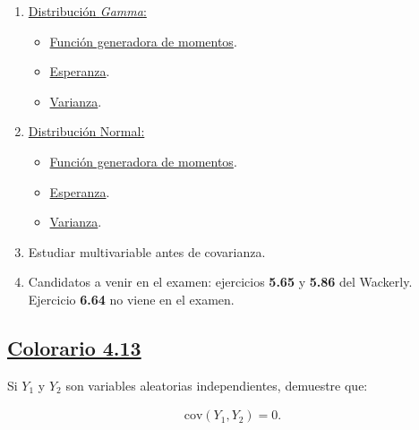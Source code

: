 \documentclass[8pt]{article}
\begin{document}
\begin{enumerate}
    \item \hyperref[subsec:distribucion_gamma]{Distribución \textit{Gamma}:}
        \label{subsec:distribucion_gamma_tag}
    \begin{itemize}
        \item \hyperref[subsec:funciongeneradora_gamma]{Función generadora de momentos}.
            \label{subsec:funciongeneradora_gamma_tag}
        \item \hyperref[subsec:esperanza_gamma]{Esperanza}.
            \label{subsec:esperanza_gamma_tag}
        \item \hyperref[subsec:varianza_gamma]{Varianza}.
            \label{subsec:varianza_gamma_tag}
    \end{itemize}

    \item \hyperref[subsec:distribucion_normal]{Distribución Normal:}
        \label{subsec:distribucion_normal_tag}
    \begin{itemize}
        \item \hyperref[subsec:funciongeneradora_normal]{Función generadora de momentos}.
            \label{subsec:funciongeneradora_normal_tag}
        \item \hyperref[subsec:esperanza_normal]{Esperanza}.
            \label{subsec:esperanza_normal_tag}
        \item \hyperref[subsec:varianza_normal]{Varianza}.
            \label{subsec:varianza_normal_tag}
    \end{itemize}

    \item Estudiar multivariable antes de covarianza.
    \item Candidatos a venir en el examen: ejercicios \textbf{5.65} y \textbf{5.86} del Wackerly. \\
        Ejercicio \textbf{6.64} no viene en el examen.
    
\end{enumerate}

\subsection*{\hyperref[subsec:colorario413_tag]{Colorario 4.13}}
\label{subsec:colorario413}

Si $Y_1$ y $Y_2$ son variables aleatorias independientes, demuestre que:

\begin{align*}
    \text{cov}\left(Y_1, Y_2\right) = 0.
\end{align*}
\end{document}
